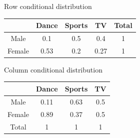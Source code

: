\documentclass{beamer}\usepackage[]{graphicx}\usepackage[]{color}
\begin{document}
\begin{frame}[fragile]{Row conditional distribution}

\begin{tabular}{|c|c|c|c|c|}
\hline
& Dance & Sports & TV  & Total \\ \hline
Male  & 0.1 & 0.5 & 0.4 &  1 \\ \hline
Female & 0.53  & 0.2 & 0.27 & 1 \\ \hline
\end{tabular}

\end{frame}

\begin{frame}[fragile]{Column conditional distribution}

\begin{tabular}{|c|c|c|c|}
\hline
& Dance & Sports & TV  \\ \hline
Male  & 0.11 & 0.63 & 0.5  \\ \hline
Female & 0.89  & 0.37 & 0.5 \\ \hline
Total & 1 & 1 & 1 \\ \hline
\end{tabular}

\end{frame}
\end{document}
